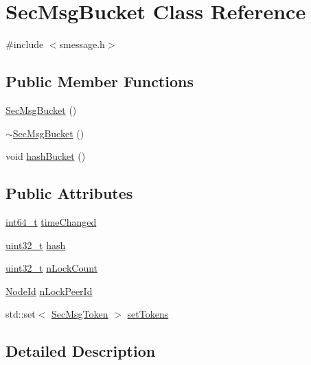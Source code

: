 \hypertarget{class_sec_msg_bucket}{}\section{Sec\+Msg\+Bucket Class Reference}
\label{class_sec_msg_bucket}


{\ttfamily \#include $<$smessage.\+h$>$}

\subsection*{Public Member Functions}
\begin{DoxyCompactItemize}
\item 
\hyperlink{class_sec_msg_bucket_a9963ecd126aa5c429543dcd9d5526551}{Sec\+Msg\+Bucket} ()
\item 
\hyperlink{class_sec_msg_bucket_a4e3c2f4001f4f3dc4b31ac566b4b6c14}{$\sim$\+Sec\+Msg\+Bucket} ()
\item 
void \hyperlink{class_sec_msg_bucket_ae6e05a91141c7cacf593b90e8c082113}{hash\+Bucket} ()
\end{DoxyCompactItemize}
\subsection*{Public Attributes}
\begin{DoxyCompactItemize}
\item 
\hyperlink{stdint_8h_adec1df1b8b51cb32b77e5b86fff46471}{int64\+\_\+t} \hyperlink{class_sec_msg_bucket_a77b045448af083e17a200f042c6d9331}{time\+Changed}
\item 
\hyperlink{stdint_8h_a435d1572bf3f880d55459d9805097f62}{uint32\+\_\+t} \hyperlink{class_sec_msg_bucket_a1ad5a6063201291474379dca235824c8}{hash}
\item 
\hyperlink{stdint_8h_a435d1572bf3f880d55459d9805097f62}{uint32\+\_\+t} \hyperlink{class_sec_msg_bucket_af12267e1275cad471f8f1873f8282280}{n\+Lock\+Count}
\item 
\hyperlink{net_8h_a954d746a58632565552615fd0a4ee660}{Node\+Id} \hyperlink{class_sec_msg_bucket_ae141dcf89fde5f3d1671cae9303f874d}{n\+Lock\+Peer\+Id}
\item 
std\+::set$<$ \hyperlink{class_sec_msg_token}{Sec\+Msg\+Token} $>$ \hyperlink{class_sec_msg_bucket_af3c53d130f0f0e1851face20ecaa0ffc}{set\+Tokens}
\end{DoxyCompactItemize}


\subsection{Detailed Description}


